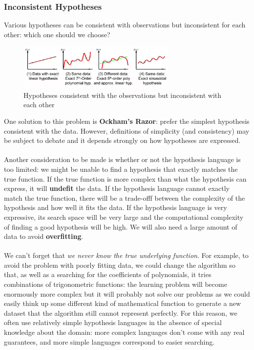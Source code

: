 \documentclass[a4paper,11pt]{article}
\begin{document}
\subsubsection{Inconsistent Hypotheses}
Various hypotheses can be consistent with observations but inconsistent for each other: which one should we choose?

\begin{figure}[H]
    \centering
    \includegraphics[width=0.7\textwidth]{images/inconsistenthypotheses.png}
    \caption{Hypotheses consistent with the observations but inconsistent with each other}
\end{figure}

One solution to this problem is \textbf{Ockham's Razor}: prefer the simplest hypothesis consistent with the data.
However, definitions of simplicity (and consistency) may be subject to debate and it depends strongly on how hypotheses are expressed.
\\\\
Another consideration to be made is whether or not the hypothesis language is too limited: we might be unable to find a hypothesis that exactly matches the true function.
If the true function is more complex than what the hypothesis can express, it will \textbf{undefit} the data.
If the hypothesis language cannot exactly match the true function, there will be a trade-offf between the complexity of the hypothesis and how well it fits the data.
If the hypothesis language is very expressive, its search space will be very large and the computational complexity of finding a good hypothesis will be high.
We will also need a large amount of data to avoid \textbf{overfitting}.
\\\\
We can't forget that \textit{we never know the true underlying function}.
For example, to avoid the problem with poorly fitting data, we could change the algorithm so that, as well as a searching for the coefficients of polynomials, it tries combinations of trigonometric functions: 
the learning problem will become enormously more complex but it will probably not solve our problems as we could easily think up some different kind of mathematical function to generate a new dataset that the algorithm still cannot represent perfectly.
For this reason, we often use relatively simple hypothesis languages in the absence of special knowledge about the domain: more complex languages don't come with any real guarantees, and more simple languages correspond to easier searching.
\end{document}
